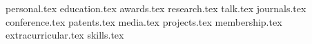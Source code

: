 \documentclass[margin,line]{res}
\newcommand*{\sectiondir}{sections/}
\begin{document}

\begin{resume}

{personal.tex}
{education.tex}
{awards.tex}
{research.tex}
{talk.tex}
{journals.tex}
{conference.tex}
{patents.tex}
{media.tex}
{projects.tex}
{membership.tex}
{extracurricular.tex}
{skills.tex}

\end{resume}
\end{document}
